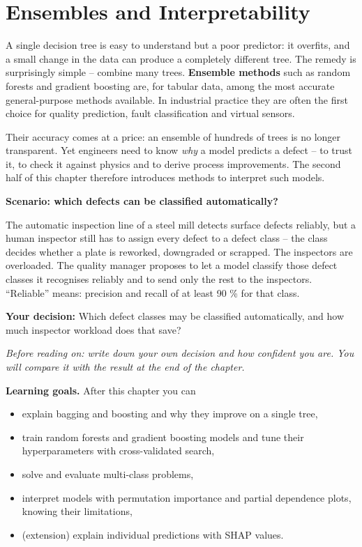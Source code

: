 \documentclass[
  letterpaper,
  DIV=11,
  numbers=noendperiod]{scrreprt}
\providecommand{\tightlist}{%
  \setlength{\itemsep}{0pt}\setlength{\parskip}{0pt}}\usepackage{longtable,booktabs,array}
\begin{document}
\chapter{Ensembles and
Interpretability}\label{ensembles-and-interpretability}

A single decision tree is easy to understand but a poor predictor: it
overfits, and a small change in the data can produce a completely
different tree. The remedy is surprisingly simple -- combine many trees.
\textbf{Ensemble methods} such as random forests and gradient boosting
are, for tabular data, among the most accurate general-purpose methods
available. In industrial practice they are often the first choice for
quality prediction, fault classification and virtual sensors.

Their accuracy comes at a price: an ensemble of hundreds of trees is no
longer transparent. Yet engineers need to know \emph{why} a model
predicts a defect -- to trust it, to check it against physics and to
derive process improvements. The second half of this chapter therefore
introduces methods to interpret such models.

\textbf{Scenario: which defects can be classified automatically?}

The automatic inspection line of a steel mill detects surface defects
reliably, but a human inspector still has to assign every defect to a
defect class -- the class decides whether a plate is reworked,
downgraded or scrapped. The inspectors are overloaded. The quality
manager proposes to let a model classify those defect classes it
recognises reliably and to send only the rest to the inspectors.
``Reliable'' means: precision and recall of at least 90 \% for that
class.

\textbf{Your decision:} Which defect classes may be classified
automatically, and how much inspector workload does that save?

\emph{Before reading on: write down your own decision and how confident
you are. You will compare it with the result at the end of the chapter.}

\textbf{Learning goals.} After this chapter you can

\begin{itemize}
\tightlist
\item
  explain bagging and boosting and why they improve on a single tree,
\item
  train random forests and gradient boosting models and tune their
  hyperparameters with cross-validated search,
\item
  solve and evaluate multi-class problems,
\item
  interpret models with permutation importance and partial dependence
  plots, knowing their limitations,
\item
  (extension) explain individual predictions with SHAP values.
\end{itemize}
\end{document}

